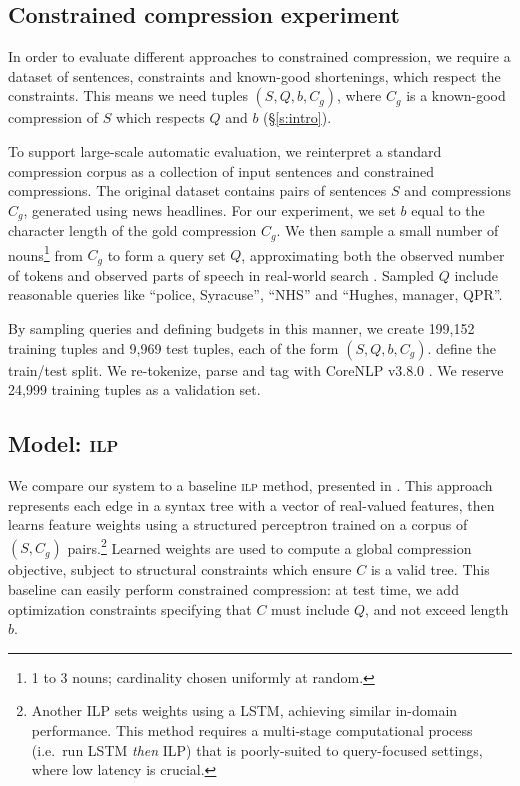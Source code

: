 \documentclass[11pt,a4paper]{article}
\begin{document}
\subsection{Constrained compression experiment}\label{s:constrained}

In order to evaluate different approaches to constrained compression, we require a dataset of sentences, constraints and known-good shortenings, which respect the constraints. This means we need tuples $(S, Q, b, C_g)$, where $C_g$ is a known-good compression of $S$ which respects $Q$ and $b$ (\S\ref{s:intro}).

To support large-scale automatic evaluation, we reinterpret a standard compression corpus \cite{filippova2013overcoming}
as a collection of input sentences and constrained compressions. The original dataset contains pairs of sentences $S$ and compressions $C_g$, generated using news headlines. For our experiment, we set $b$ equal to the character length of the gold compression $C_g$. We then sample a small number of nouns\footnote{1 to 3 nouns; cardinality chosen uniformly at random.} from $C_g$ to form a query set $Q$, approximating both the observed number of tokens and observed parts of speech in real-world search \cite{Jansen2000RealLR,Barr2008TheLS}. Sampled $Q$ include reasonable queries like ``police, Syracuse'', ``NHS'' and ``Hughes, manager, QPR''.

By sampling queries and defining budgets in this manner, we create {199,152} training tuples and {9,969} test tuples, each of the form $(S,Q,b,C_g)$. \citet{filippova2013overcoming} define the train/test split. We re-tokenize, parse and tag with CoreNLP v3.8.0 \cite{corenlp}. We reserve 24,999 training tuples as a validation set. 

\subsection{Model: \textsc{ilp}}\label{s:ilp}

We compare our system to a baseline \textsc{ilp} method, presented in \citet{filippova2013overcoming}. This approach represents each edge in a syntax tree with a vector of real-valued features, then learns feature weights using a structured perceptron trained on a corpus of $(S,C_g)$ pairs.\footnote{Another ILP \cite{Wang2017CanSH} sets weights using a LSTM, achieving similar in-domain performance. This method requires a multi-stage computational process (i.e.\ run LSTM \textit{then} ILP) that is poorly-suited to query-focused settings, where low latency is crucial.} Learned weights are used to compute a global compression objective, subject to structural constraints which ensure $C$ is a valid tree. This baseline can easily perform constrained compression: at test time, we add optimization constraints specifying that $C$ must include $Q$, and not exceed length $b$.
\end{document}
